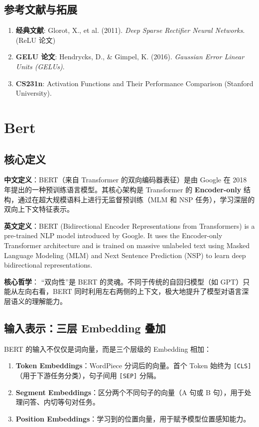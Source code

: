 \documentclass[12pt, a4paper]{book}
\begin{document}
\section{参考文献与拓展}
\begin{enumerate}
    \item \textbf{经典文献}: Glorot, X., et al. (2011). \textit{Deep Sparse Rectifier Neural Networks}. (ReLU 论文)
    \item \textbf{GELU 论文}: Hendrycks, D., & Gimpel, K. (2016). \textit{Gaussian Error Linear Units (GELUs)}.
    \item \textbf{CS231n}: Activation Functions and Their Performance Comparison (Stanford University).
\end{enumerate}

\chapter{Bert}


\section{核心定义}
\textbf{中文定义}：BERT（来自 Transformer 的双向编码器表征）是由 Google 在 2018 年提出的一种预训练语言模型。其核心架构是 Transformer 的 \textbf{Encoder-only} 结构，通过在超大规模语料上进行无监督预训练（MLM 和 NSP 任务），学习深层的双向上下文特征表示。

\textbf{英文定义}：BERT (Bidirectional Encoder Representations from Transformers) is a pre-trained NLP model introduced by Google. It uses the Encoder-only Transformer architecture and is trained on massive unlabeled text using Masked Language Modeling (MLM) and Next Sentence Prediction (NSP) to learn deep bidirectional representations.

\textbf{核心哲学}：
“双向性”是 BERT 的灵魂。不同于传统的自回归模型（如 GPT）只能从左向右看，BERT 同时利用左右两侧的上下文，极大地提升了模型对语言深层语义的理解能力。

\section{输入表示：三层 Embedding 叠加}
BERT 的输入不仅仅是词向量，而是三个层级的 Embedding 相加：
\begin{enumerate}
    \item \textbf{Token Embeddings}：WordPiece 分词后的向量。首个 Token 始终为 \texttt{[CLS]}（用于下游任务分类），句子间用 \texttt{[SEP]} 分隔。
    \item \textbf{Segment Embeddings}：区分两个不同句子的向量（A 句或 B 句），用于处理问答、内切等句对任务。
    \item \textbf{Position Embeddings}：学习到的位置向量，用于赋予模型位置感知能力。
\end{enumerate}
\end{document}
